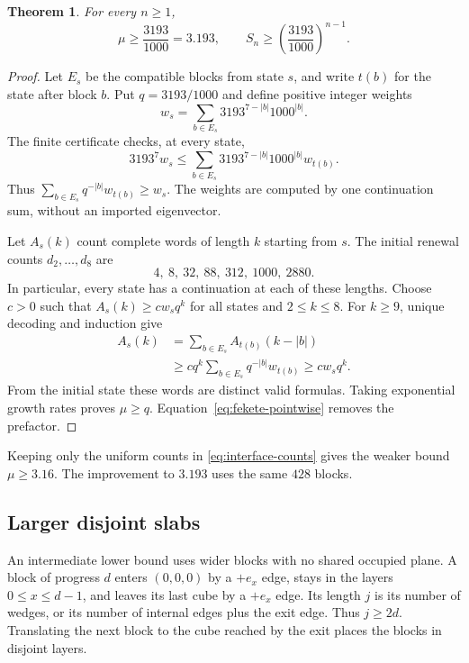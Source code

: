 \documentclass[conference]{IEEEtran}
\newtheorem{theorem}{Theorem}
\begin{document}
\begin{theorem}\label{thm:formal-lower}
For every $n\geq1$,
\[
 \mu\geq\frac{3193}{1000}=3.193,\qquad
 S_n\geq\left(\frac{3193}{1000}\right)^{n-1}.
\]
\end{theorem}
\begin{proof}
Let $E_s$ be the compatible blocks from state $s$, and write $t(b)$
for the state after block $b$. Put $q=3193/1000$ and define
positive integer weights
\[
 w_s=\sum_{b\in E_s}3193^{7-|b|}1000^{|b|}.
\]
The finite certificate checks, at every state,
\begin{equation}\label{eq:weighted-interface}
 3193^7w_s\leq
 \sum_{b\in E_s}3193^{7-|b|}1000^{|b|}w_{t(b)}.
\end{equation}
Thus $\sum_{b\in E_s}q^{-|b|}w_{t(b)}\geq w_s$.
The weights are computed by one continuation sum, without an
imported eigenvector.

Let $A_s(k)$ count complete words of length $k$ starting from $s$.
The initial renewal counts $d_2,\ldots,d_8$ are
\[
 4,\ 8,\ 32,\ 88,\ 312,\ 1000,\ 2880.
\]
In particular, every state has a continuation at each of these
lengths. Choose $c>0$ such that $A_s(k)\geq c w_s q^k$ for all
states and $2\leq k\leq8$.
For $k\geq9$, unique decoding and induction give
\[
 \begin{aligned}
 A_s(k)&=\sum_{b\in E_s}A_{t(b)}(k-|b|)\\
       &\geq c q^k\sum_{b\in E_s}q^{-|b|}w_{t(b)}
        \geq c w_s q^k.
 \end{aligned}
\]
From the initial state these words are distinct valid formulas.
Taking exponential growth rates proves $\mu\geq q$.
Equation~\eqref{eq:fekete-pointwise} removes the prefactor.
\end{proof}

Keeping only the uniform counts in \eqref{eq:interface-counts}
gives the weaker bound $\mu\geq3.16$. The improvement to $3.193$
uses the same $428$ blocks.

\subsection{Larger disjoint slabs}\label{sec:slabs}

An intermediate lower bound uses wider blocks with no shared occupied
plane. A block of progress $d$ enters $(0,0,0)$ by a
$+e_x$ edge, stays in the layers $0\leq x\leq d-1$, and leaves
its last cube by a $+e_x$ edge. Its length $j$ is its number of
wedges, or its number of internal edges plus the exit edge.
Thus $j\geq2d$. Translating the next block to the cube reached
by the exit places the blocks in disjoint layers.
\end{document}
